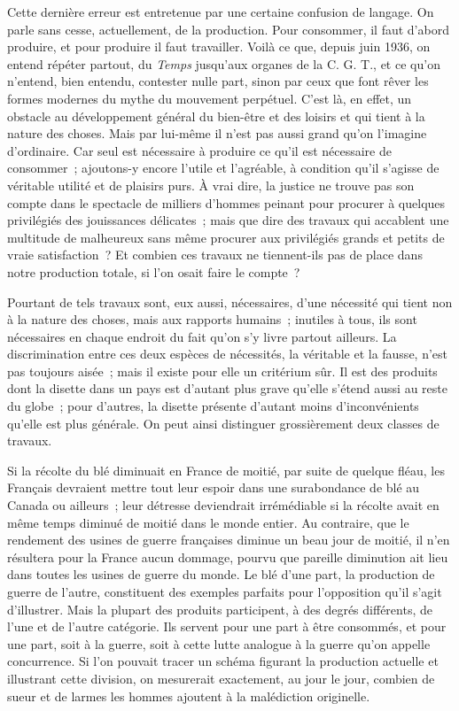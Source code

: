 \documentclass[french,twoside]{book} %
\begin{document}
Cette dernière erreur est entretenue par une certaine confusion de langage. On parle sans cesse, actuellement, de la production. Pour consommer, il faut d'abord produire, et pour produire il faut travailler. Voilà ce que, depuis juin 1936, on entend répéter partout, du {\itshape Temps} jusqu'aux organes de la C. G. T., et ce qu'on n'entend, bien entendu, contester nulle part, sinon par ceux que font rêver les formes modernes du mythe du mouvement perpétuel. C'est là, en effet, un obstacle au développement général du bien-être et des loisirs et qui tient à la nature des choses. Mais par lui-même il n'est pas aussi grand qu'on l'imagine d'ordinaire. Car seul est nécessaire à produire ce qu'il est nécessaire de consommer ; ajoutons-y encore l'utile et l'agréable, à condition qu'il s'agisse de véritable utilité et de plaisirs purs. À vrai dire, la justice ne trouve pas son compte dans le spectacle de milliers d'hommes peinant pour procurer à quelques privilégiés des jouissances délicates ; mais que dire des travaux qui accablent une multitude de malheureux sans même procurer aux privilégiés grands et petits de vraie satisfaction ? Et combien ces travaux ne tiennent-ils pas de place dans notre production totale, si l'on osait faire le compte ?\par
Pourtant de tels travaux sont, eux aussi, nécessaires, d'une nécessité qui tient non à la nature des choses, mais aux rapports humains ; inutiles à tous, ils sont nécessaires en chaque endroit du fait qu'on s'y livre partout ailleurs. La discrimination entre ces deux espèces de nécessités, la véritable et la fausse, n'est pas toujours aisée ; mais il existe pour elle un critérium sûr. Il est des produits dont la disette dans un pays est d'autant plus grave qu'elle s'étend aussi au reste du globe ; pour d'autres, la disette présente d'autant moins d'inconvénients qu'elle est plus générale. On peut ainsi distinguer grossièrement deux classes de travaux.\par
Si la récolte du blé diminuait en France de moitié, par suite de quelque fléau, les Français devraient mettre tout leur espoir dans une surabondance de blé au Canada ou ailleurs ; leur détresse deviendrait irrémédiable si la récolte avait en même temps diminué de moitié dans le monde entier. Au contraire, que le rendement des usines de guerre françaises diminue un beau jour de moitié, il n'en résultera pour la France aucun dommage, pourvu que pareille diminution ait lieu dans toutes les usines de guerre du monde. Le blé d'une part, la production de guerre de l'autre, constituent des exemples parfaits pour l'opposition qu'il s'agit d'illustrer. Mais la plupart des produits participent, à des degrés différents, de l'une et de l'autre catégorie. Ils servent pour une part à être consommés, et pour une part, soit à la guerre, soit à cette lutte analogue à la guerre qu'on appelle concurrence. Si l'on pouvait tracer un schéma figurant la production actuelle et illustrant cette division, on mesurerait exactement, au jour le jour, combien de sueur et de larmes les hommes ajoutent à la malédiction originelle.\par
\end{document}
